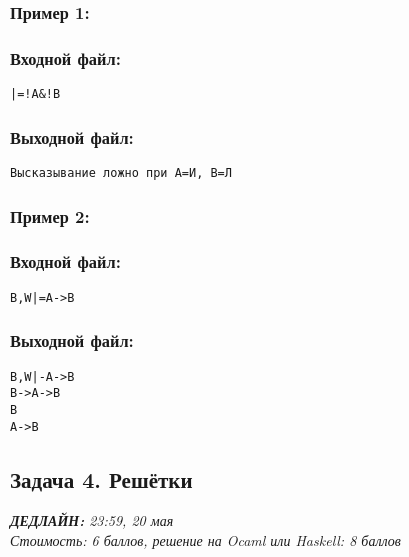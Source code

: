 \documentclass[11pt,a4paper,oneside]{article}
\begin{document}
\subsubsection*{Пример 1:}
\begin{minipage}[t]{.5\textwidth}
\subsubsection*{Входной файл:}
\begin{verbatim}
|=!A&!B
\end{verbatim}
\end{minipage}
\begin{minipage}[t]{.5\textwidth}
\subsubsection*{Выходной файл:}
\begin{verbatim}
Высказывание ложно при A=И, B=Л
\end{verbatim}
\end{minipage}

\subsubsection*{Пример 2:}
\begin{minipage}[t]{.5\textwidth}
\subsubsection*{Входной файл:}
\begin{verbatim}
B,W|=A->B
\end{verbatim}
\end{minipage}
\begin{minipage}[t]{.5\textwidth}
\subsubsection*{Выходной файл:}
\begin{verbatim}
B,W|-A->B
B->A->B
B
A->B
\end{verbatim}
\end{minipage}

\subsection*{Задача 4. Решётки}
{\it \textbf{ДЕДЛАЙН:} 23:59, 20 мая }\vspace{2mm}\\
{\it Стоимость: 6 баллов, решение на Ocaml или Haskell: 8 баллов }\vspace{2mm}\\
\end{document}
